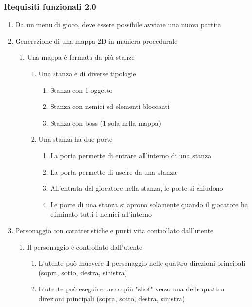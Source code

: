 \subsubsection{Requisiti funzionali 2.0}
\begin{enumerate}
    \item Da un menu di gioco, deve essere possibile avviare una nuova partita
    \item Generazione di una mappa 2D in maniera procedurale
    \begin{enumerate}
        \item Una mappa è formata da più stanze
        \begin{enumerate}
            \item Una stanza è di diverse tipologie
            \begin{enumerate}
                \item Stanza con 1 oggetto
                \item Stanza con nemici ed elementi bloccanti
                \item Stanza con boss (1 sola nella mappa)
            \end{enumerate}
            \item Una stanza ha due porte 
            \begin{enumerate}
            \item La porta permette di entrare all'interno di una stanza
            \item La porta permette di uscire da una stanza
            \item All'entrata del giocatore nella stanza, le porte si chiudono
            \item Le porte di una stanza si aprono solamente quando il giocatore ha eliminato tutti i nemici all'interno
            \end{enumerate}
        \end{enumerate}
    \end{enumerate}
    \item Personaggio con caratteristiche e punti vita controllato dall'utente
    \begin{enumerate}
        \item Il personaggio è controllato dall'utente
        \begin{enumerate}
            \item L'utente può muovere il personaggio nelle quattro direzioni principali (sopra, sotto, destra, sinistra)
            \item L'utente può eseguire uno o più "shot" verso una delle quattro direzioni principali (sopra, sotto, destra, sinistra)

\end{enumerate}
\end{enumerate}
\end{enumerate}

